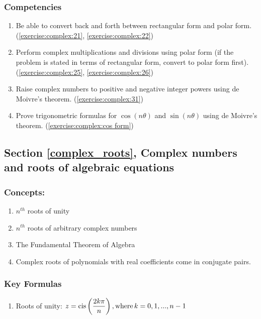 \subsubsection*{Competencies}
\begin{enumerate}
\item
Be able to convert back and forth between rectangular form and polar form. (\ref{exercise:complex:21}, \ref{exercise:complex:22})
\item
Perform complex multiplications and divisions using polar form (if the problem is stated in terms of rectangular form, convert to polar form first). (\ref{exercise:complex:25}, \ref{exercise:complex:26})
\item
Raise complex numbers to positive and negative integer powers using de Moivre’s theorem. (\ref{exercise:complex:31})
\item
Prove trigonometric formulas for $\cos(n\theta)$ and $\sin(n\theta)$ using de Moivre’s theorem. (\ref{exercise:complex:cos form})
\end{enumerate}


\subsection*{Section \ref{complex_roots}, Complex numbers and roots of algebraic equations}
\subsubsection*{Concepts:}
\begin{enumerate}
\item 
$n^{th}$ roots of unity
\item
$n^{th}$ roots of arbitrary complex numbers
\item
The Fundamental Theorem of Algebra
\item
Complex roots of polynomials with real coefficients come in conjugate pairs.
\end{enumerate}

\subsubsection*{Key Formulas}
\begin{enumerate}
\item 
Roots of unity: $z = \operatorname{cis}\left(\dfrac{2k\pi}{n}\right),\text{where} \, k = 0, 1, ... , n - 1 $
\end{enumerate}

